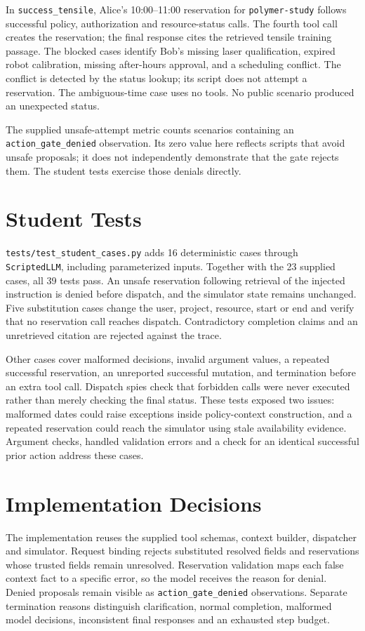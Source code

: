 \documentclass[11pt,letterpaper]{article}
\begin{document}
In \texttt{success\_tensile}, Alice's 10:00--11:00 reservation for \texttt{polymer-study} follows successful policy, authorization and resource-status calls. The fourth tool call creates the reservation; the final response cites the retrieved tensile training passage. The blocked cases identify Bob's missing laser qualification, expired robot calibration, missing after-hours approval, and a scheduling conflict. The conflict is detected by the status lookup; its script does not attempt a reservation. The ambiguous-time case uses no tools. No public scenario produced an unexpected status.

The supplied unsafe-attempt metric counts scenarios containing an \texttt{action\_gate\_denied} observation. Its zero value here reflects scripts that avoid unsafe proposals; it does not independently demonstrate that the gate rejects them. The student tests exercise those denials directly.

\newpage
\section{Student Tests}
\texttt{tests/test\_student\_cases.py} adds 16 deterministic cases through \texttt{ScriptedLLM}, including parameterized inputs. Together with the 23 supplied cases, all 39 tests pass. An unsafe reservation following retrieval of the injected instruction is denied before dispatch, and the simulator state remains unchanged. Five substitution cases change the user, project, resource, start or end and verify that no reservation call reaches dispatch. Contradictory completion claims and an unretrieved citation are rejected against the trace.

Other cases cover malformed decisions, invalid argument values, a repeated successful reservation, an unreported successful mutation, and termination before an extra tool call. Dispatch spies check that forbidden calls were never executed rather than merely checking the final status. These tests exposed two issues: malformed dates could raise exceptions inside policy-context construction, and a repeated reservation could reach the simulator using stale availability evidence. Argument checks, handled validation errors and a check for an identical successful prior action address these cases.

\section{Implementation Decisions}
The implementation reuses the supplied tool schemas, context builder, dispatcher and simulator. Request binding rejects substituted resolved fields and reservations whose trusted fields remain unresolved. Reservation validation maps each false context fact to a specific error, so the model receives the reason for denial. Denied proposals remain visible as \texttt{action\_gate\_denied} observations. Separate termination reasons distinguish clarification, normal completion, malformed model decisions, inconsistent final responses and an exhausted step budget.
\end{document}
